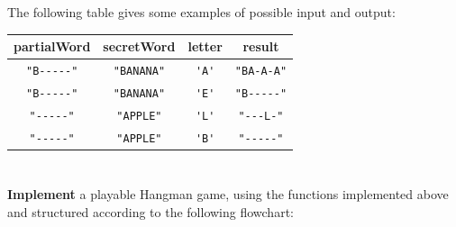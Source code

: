 \documentclass{scrartcl}
\begin{document}
The following table gives some examples of possible input and output:

\begin{center}
\begin{tabular}{|ccc|c|}
\hline
partialWord & secretWord & letter & result \\ \hline
\lstinline{"B-----"} & \lstinline{"BANANA"} & \lstinline{'A'} & \lstinline{"BA-A-A"} \\ \hline
\lstinline{"B-----"} & \lstinline{"BANANA"} & \lstinline{'E'} & \lstinline{"B-----"} \\ \hline
\lstinline{"-----"} & \lstinline{"APPLE"} & \lstinline{'L'} & \lstinline{"---L-"} \\ \hline
\lstinline{"-----"} & \lstinline{"APPLE"} & \lstinline{'B'} & \lstinline{"-----"} \\ \hline
\end{tabular}
\end{center}

\section{} \label{core-a-last}

\textbf{Implement} a playable Hangman game, using the functions implemented above and structured
according to the following flowchart:
\end{document}
